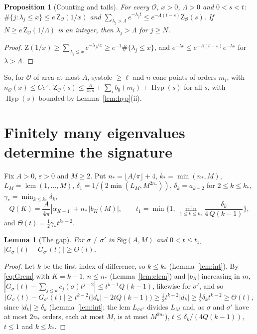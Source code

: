 \documentclass[pdflatex,sn-mathphys-num]{sn-jnl}
\theoremstyle{thmstyleone}%
\newtheorem{lemma}[theorem]{Lemma}%
\newtheorem{proposition}[theorem]{Proposition}%
\theoremstyle{thmstylethree}%
\newcommand{\Orb}{\mathcal{O}}
\newcommand{\Sig}{\mathrm{Sig}}
\newcommand{\Hyp}{\operatorname{Hyp}}
\newcommand{\cZ}{\mathrm{Z}}
\begin{document}
\begin{proposition}[Counting and tails]\label{prop:counttail}
For every $\Orb$, $x>0$, $\Lambda>0$ and $0<s<t$: $\#\{j:\lambda_j\le x\}\le e\,\cZ_\Orb(1/x)$ and $\sum_{\lambda_j>\Lambda}e^{-\lambda_jt}\le e^{-\Lambda(t-s)}\cZ_\Orb(s)$. If $N\ge e\,\cZ_\Orb(1/\Lambda)$ is an integer, then $\lambda_j>\Lambda$ for $j\ge N$.
\end{proposition}

\begin{proof}
$\cZ(1/x)\ge\sum_{\lambda_j\le x}e^{-\lambda_j/x}\ge e^{-1}\#\{\lambda_j\le x\}$, and $e^{-\lambda t}\le e^{-\Lambda(t-s)}e^{-\lambda s}$ for $\lambda>\Lambda$.
\end{proof}

So, for $\Orb$ of area at most $A$, systole $\ge\ell$ and $n$ cone points of orders $m_i$, with $n_\Orb(x)\le Ce^x$, $\cZ_\Orb(s)\le\frac A{4\pi s}+\sum_ib_0(m_i)+\Hyp(s)$ for all $s$, with $\Hyp(s)$ bounded by Lemma~\ref{lem:hyp}(ii).

\section{Finitely many eigenvalues determine the signature}\label{sec:E}

Fix $A>0$, $\varepsilon>0$ and $M\ge2$. Put $n_*=\lfloor A/\pi\rfloor+4$, $k_*=\min(n_*,M)$, $L_M=\operatorname{lcm}(1,\dots,M)$, $\delta_1=1/(2\min(L_M,M^{2n_*}))$, $\delta_k=a_{k-2}$ for $2\le k\le k_*$, $\gamma_*=\min_{k\le k_*}\delta_k$,
\[
  Q(K)=\frac A{4\pi}|\alpha_{K+1}|+n_*\,|b_K(M)|,\qquad t_1=\min\Big\{1,\ \min_{1\le k\le k_*}\frac{\delta_k}{4\,Q(k-1)}\Big\},
\]
and $\Theta(t)=\frac12\gamma_*t^{k_*-2}$.

\begin{lemma}[The gap]\label{lem:gap}
For $\sigma\ne\sigma'$ in $\Sig(A,M)$ and $0<t\le t_1$, $|G_\sigma(t)-G_{\sigma'}(t)|\ge\Theta(t)$.
\end{lemma}

\begin{proof}
Let $k$ be the first index of difference, so $k\le k_*$ (Lemma~\ref{lem:int}). By \eqref{eq:Grem} with $K=k-1$, $n\le n_*$ (Lemma~\ref{lem:elem}) and $|b_K|$ increasing in $m$, $|G_\sigma(t)-\sum_{j\le k}c_j(\sigma)t^{j-2}|\le t^{k-1}Q(k-1)$, likewise for $\sigma'$, and so
\[
  |G_\sigma(t)-G_{\sigma'}(t)|\ge t^{k-2}\big(|d_k|-2tQ(k-1)\big)\ge\tfrac12t^{k-2}|d_k|\ge\tfrac12\delta_kt^{k-2}\ge\Theta(t),
\]
since $|d_k|\ge\delta_k$ (Lemma~\ref{lem:int}; the lcm $L_{\sigma\sigma'}$ divides $L_M$ and, as $\sigma$ and $\sigma'$ have at most $2n_*$ orders, each at most $M$, is at most $M^{2n_*}$), $t\le\delta_k/(4Q(k-1))$, $t\le1$ and $k\le k_*$.
\end{proof}
\end{document}
